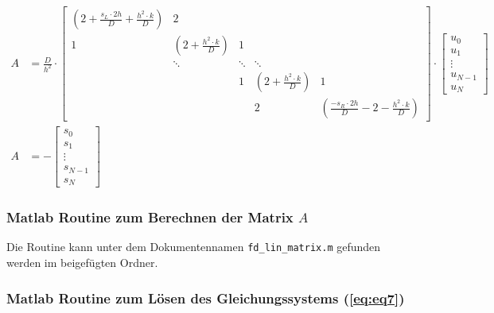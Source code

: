 \documentclass[
	pagesize,
	fontsize=12pt,
	paper=a4,
	oneside,
   reqno
]{scrartcl}
\begin{document}
\begin{align*}
   A &= \frac{D}{h^2}\cdot
   \begin{bmatrix*}
      \left( 2+\frac{s_L\cdot 2h}{D}+\frac{h^2\cdot k}{D}\right)  & 2 \\
                     1                                            & \left( 2+\frac{h^2\cdot k}{D}\right) & 1 \\
                                                                  & \ddots                               & \ddots & \ddots \\
                                                                                                         &        & 1   & \left( 2+\frac{h^2\cdot k}{D}\right) & 1 \\
                                                                                                         &        &     & 2                                    & \left( \frac{-s_R\cdot 2h}{D}-2-\frac{h^2\cdot k}{D}\right)
   \end{bmatrix*}
   \cdot
   \begin{bmatrix*}
      u_0 \\
      u_1 \\
      \vdots \\
      u_{N-1} \\
      u_N
   \end{bmatrix*}
   \\
   A &= -
   \begin{bmatrix*}
      s_0 \\
      s_1 \\
      \vdots \\
      s_{N-1} \\
      s_N
   \end{bmatrix*}
\end{align*}

\subsubsection{Matlab Routine zum Berechnen der Matrix $A$}

Die Routine kann unter dem Dokumentennamen \texttt{fd\_lin\_matrix.m} gefunden werden im beigefügten Ordner.

\subsubsection{Matlab Routine zum Lösen des Gleichungssystems (\autoref{eq:eq7})}
\end{document}
